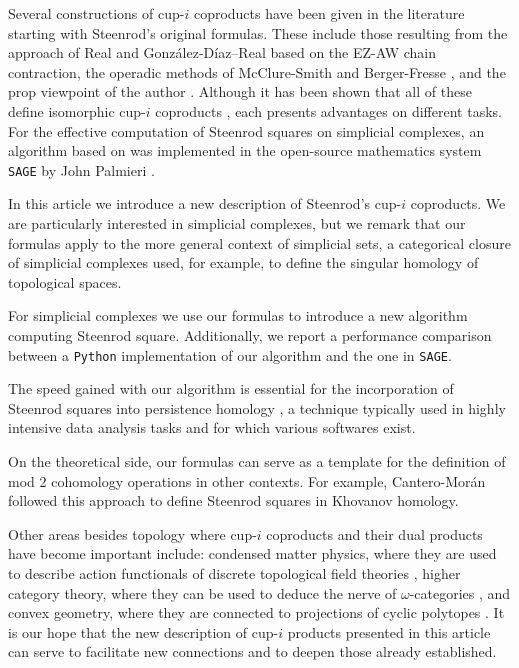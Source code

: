 Several constructions of cup-$i$ coproducts have been given in the literature starting with Steenrod's original formulas.
These include those resulting from the approach of Real \cite{real1996computability} and Gonz\'alez-D\'iaz--Real \cite{gonzalez1999combinatorial, gonzalez2003computation, gonzalez2005hpt} based on the EZ-AW chain contraction, the operadic methods of McClure-Smith \cite{mcclure03cochain} and Berger-Fresse \cite{berger04combinatorial}, and the prop viewpoint of the author \cite{medina2020prop1, medina2018prop2}.
Although it has been shown that all of these define isomorphic cup-$i$ coproducts \cite{medina2018axiomatic}, each presents advantages on different tasks.
For the effective computation of Steenrod squares on simplicial complexes, an algorithm based on \cite{gonzalez1999combinatorial} was implemented in the open-source mathematics system \verb|SAGE| by John Palmieri \cite{sagemath}.

In this article we introduce a new description of Steenrod's cup-$i$ coproducts.
We are particularly interested in simplicial complexes, but we remark that our formulas apply to the more general context of simplicial sets, a categorical closure of simplicial complexes used, for example, to define the singular homology of topological spaces.

For simplicial complexes we use our formulas to introduce a new algorithm computing Steenrod square.
Additionally, we report a performance comparison between a \verb|Python| implementation of our algorithm and the one in \verb|SAGE|.

The speed gained with our algorithm is essential for the incorporation of Steenrod squares into persistence homology \cite{medina2018persistence}, a technique typically used in highly intensive data analysis tasks \cite{carlsson2008images, carlsson2013viral, lee2018nanoporous} and for which various softwares \cite{bauer2019ripser, gudhi, medina2020giottotda} exist.

On the theoretical side, our formulas can serve as a template for the definition of mod 2 cohomology operations in other contexts.
For example, Cantero-Mor\'an \cite{cantero2020khovanov} followed this approach to define Steenrod squares in Khovanov homology.

Other areas besides topology where cup-$i$ coproducts and their dual products have become important include: condensed matter physics, where they are used to describe action functionals of discrete topological field theories \cite{gaiotto2016spin, bhardwaj2017state, kapustin2017fermionic}, higher category theory, where they can be used to deduce the nerve of $\omega$-categories \cite{medina2020globular}, and convex geometry, where they are connected to projections of cyclic polytopes \cite{kapranov1991combinatorial}.
It is our hope that the new description of cup-$i$ products presented in this article can serve to facilitate new connections and to deepen those already established.

